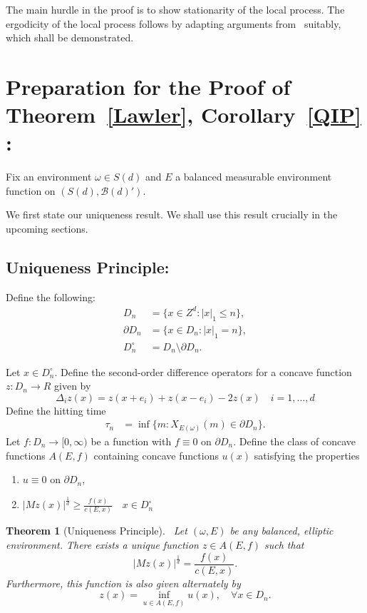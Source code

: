 \documentclass[final]{aomart}
\def\mathscr#1{#1}%
\def\mathbb#1{#1}%
\theoremstyle{plain}
\newtheorem{theorem}{Theorem}[section]
\theoremstyle{definition}
\theoremstyle{remark}
\begin{document}
The main hurdle in the proof is to show stationarity of the local process. The ergodicity of the local process follows by adapting arguments from~\cite{BolthausenSznitman2002} suitably, which shall be demonstrated.

\section{Preparation for the Proof of Theorem~\ref{Lawler}, Corollary~\ref{QIP} :}

Fix an environment ${\omega} \in \mathscr{S}(d)$ and $\mathscr{E}$ a balanced measurable environment function on $(\mathscr{S}(d), \mathcal{B}(d)')$. 
 
We first state our uniqueness result. We shall use this result crucially in the upcoming sections.
\subsection{Uniqueness Principle: }
Define the following: \begin{align*}
D_n 
&= \{ x \in \mathbb{Z}^d : |x|_1 \le n \}, \\[0.3em]
\partial D_n 
&= \{ x \in D_n : |x|_1 = n \}, \\[0.3em]
D_n^{\circ} 
&= D_n \setminus \partial D_n .
\end{align*}

Let $x \in D_n^{\circ}$. Define the second-order difference operators for a concave function $z:D_n \to \mathbb{R}$ given by \[
\Delta_iz(x) = z(x+e_i) +z(x-e_i) -2z(x)\quad i=1,\dots,d
\]
Define the hitting time \begin{align*}
\tau_n 
&= \inf \{m: X_{\mathscr{E}(\omega)}(m) \in \partial D_n\}.
\end{align*}
Let $f:D_n \to [0,\infty)$ be a function with $f \equiv 0 $ on $\partial D_n$. Define the class of concave functions $\mathscr{A}(\mathscr{E},f)$ containing concave functions $u(x)$ satisfying the properties \begin{enumerate}
    \item $u \equiv 0$ on $\partial D_n$, 
    \item $|Mz(x)|^{\frac{1}{d}} \geq \frac{f(x)}{c(\mathscr{E},x)} \quad x \in D_n^{\circ}$ 
\end{enumerate}
\begin{theorem}[Uniqueness Principle]~\label{Uniqueness}
Let $(\omega, \mathscr{E})$ be any balanced, elliptic environment. There exists a unique function $z \in \mathscr{A}(\mathscr{E},f)$ such that \[
|Mz(x)|^{\frac{1}{d}} = \frac{f(x)}{c(\mathscr{E},x)}.
\] 
Furthermore, this function is also given alternately by \[
z(x) = \inf_{u \in \mathscr{A}(\mathscr{E},f)} u(x), \quad \forall x\in D_n.
\] 
\end{theorem}
\end{document}
